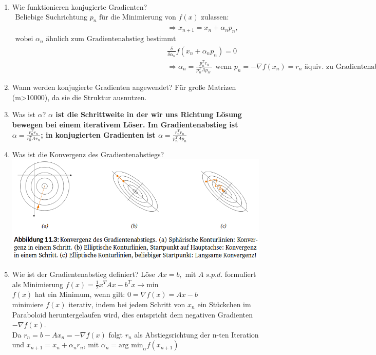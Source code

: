 \documentclass[10pt,a4paper,titlepage]{article}
\begin{document}
\begin{enumerate}[resume=b]
	\item Wie funktionieren konjugierte Gradienten?
	\begin{align*}
	\text{Beliebige Suchrichtung }p_n \text{ für die Minimierung von } f(x) \text{ zulassen:}\\
	&\Rightarrow x_{n+1}=x_n+\alpha_np_n,\\
	\text{wobei }\alpha_n \text{ ähnlich zum Gradientenabstieg bestimmt werden kann:}\\
	&\frac{\delta}{\delta \alpha_n}f(x_n+\alpha_np_n) = 0\\
	&\Rightarrow \alpha_n=\frac{p_n^Tr_n}{p_n^TAp_n,} \text{ wenn }p_n=-\nabla f(x_n)=r_n \text{ äquiv. zu Gradientenabstieg}
	\end{align*}
	\item Wann werden konjugierte Gradienten angewendet? \newline
	Für große Matrizen (m>10000), da sie die Struktur ausnutzen.
	\item Was ist $\alpha$? \newline
	\textbf{$\alpha$ ist die Schrittweite in der wir uns Richtung Lösung bewegen bei einem iterativem Löser. Im Gradientenabstieg ist $\alpha=\frac{r^{T}_{n} r_n}{r^{T}_{n} A r_n}$; in konjugierten Gradienten 
		ist $\alpha=\frac{r^{T}_{n} r_n}{p^{T}_{n} A p_n}$ }
	\item Was ist die Konvergenz des Gradientenabstiegs?\\
	\includegraphics[scale=0.3]{konvergenzgradient}
	\item Wie ist der Gradientenabstieg definiert?\newline
	Löse $Ax=b, \text{ mit } A \;s.p.d.$ formuliert als Minimierung $f(x)=\frac{1}{2}x^TAx-b^Tx \rightarrow \text{min}$\\
	$f(x)$ hat ein Minimum, wenn gilt: $0=\nabla f(x)=Ax-b$\\
	minimiere $f(x)$ iterativ, indem bei jedem Schritt von $x_n$ ein Stückchen im Paraboloid heruntergelaufen wird, dies entspricht dem negativen Gradienten $-\nabla f(x)$.\\
	Da $r_n=b-Ax_n=-\nabla f(x)$ folgt $r_n$ als Abstiegsrichtung der n-ten Iteration und $x_{n+1}=x_n+\alpha_nr_n$, mit $\alpha_n=\text{arg min}_\alpha f(x_{n+1})$


\end{enumerate}
\end{document}
